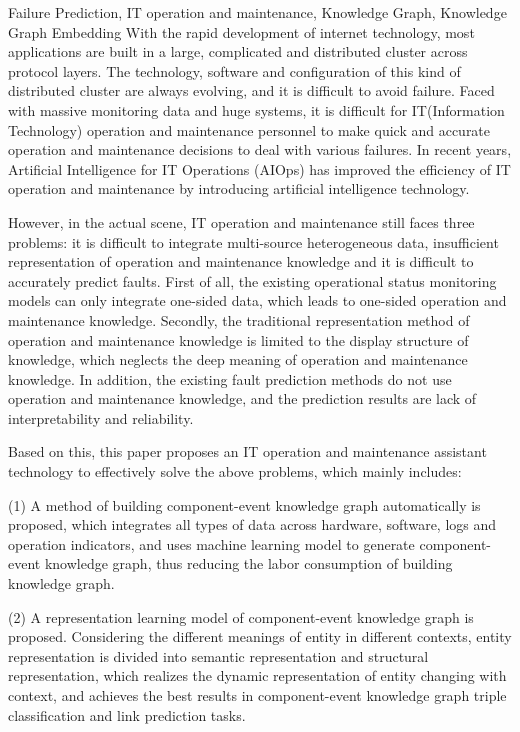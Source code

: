 \begin{englishabstract}{Failure Prediction, IT operation and maintenance, Knowledge Graph, Knowledge Graph Embedding}
With the rapid development of internet technology, most applications are built in a large, complicated and distributed cluster across protocol layers. The technology, software and configuration of this kind of distributed cluster are always evolving, and it is difficult to avoid failure. Faced with massive monitoring data and huge systems, it is difficult for IT(Information Technology) operation and maintenance personnel to make quick and accurate operation and maintenance decisions to deal with various failures. In recent years, Artificial Intelligence for IT Operations (AIOps) has improved the efficiency of IT operation and maintenance by introducing artificial intelligence technology. 

However, in the actual scene, IT operation and maintenance still faces three problems: it is difficult to integrate multi-source heterogeneous data, insufficient representation of operation and maintenance knowledge and it is difficult to accurately predict faults. First of all, the existing operational status monitoring models can only integrate one-sided data, which leads to one-sided operation and maintenance knowledge. Secondly, the traditional representation method of operation and maintenance knowledge is limited to the display structure of knowledge, which neglects the deep meaning of operation and maintenance knowledge. In addition, the existing fault prediction methods do not use operation and maintenance knowledge, and the prediction results are lack of interpretability and reliability.

Based on this, this paper proposes an IT operation and maintenance assistant technology to effectively solve the above problems, which mainly includes: 

(1) A method of building component-event knowledge graph automatically is proposed, which integrates all types of data across hardware, software, logs and operation indicators, and uses machine learning model to generate component-event knowledge graph, thus reducing the labor consumption of building knowledge graph.

(2) A representation learning model of component-event knowledge graph is proposed. Considering the different meanings of entity in different contexts, entity representation is divided into semantic representation and structural representation, which realizes the dynamic representation of entity changing with context, and achieves the best results in component-event knowledge graph triple classification and link prediction tasks. 


\end{englishabstract}
